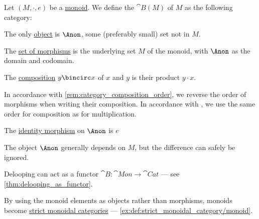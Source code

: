 \begin{definition}\label{def:monoid_delooping}
  Let \( (M, \cdot, e) \) be a \hyperref[def:monoid]{monoid}. We define the  \( \cat{B}(M) \) of \( M \) as the following category:
  \begin{thmenum}
     The only \hyperref[def:category/objects]{object} is \( \Anon \), some (preferably small) set not in \( M \).

     The \hyperref[def:category/morphisms]{set of morphisms} is the underlying set \( M \) of the monoid, with \( \Anon \) as the domain and codomain.

     The \hyperref[def:category/composition]{composition} \( y \bincirc x \) of \( x \) and \( y \) is their product \( y \cdot x \).

    In accordance with \cref{rem:category_composition_order}, we reverse the order of morphisms when writing their composition. In accordance with \cite[def. 1.1.7]{Perrone2024StartingCategoryTheory}, we use the same order for composition as for multiplication.

     The \hyperref[def:category/identity]{identity morphism} on \( \Anon \) is \( e \)
  \end{thmenum}
\end{definition}
\begin{comments}
  \item The object \( \Anon \) generally depends on \( M \), but the difference can safely be ignored.
  \item Delooping can act as a functor \( \cat{B}: \cat{Mon} \to \cat{Cat} \) --- see \cref{thm:delooping_as_functor}.
  \item By using the monoid elements as objects rather than morphisms, monoids become \hyperref[def:strict_monoidal_category]{strict monoidal categories} --- \cref{ex:def:strict_monoidal_category/monoid}.
\end{comments}

